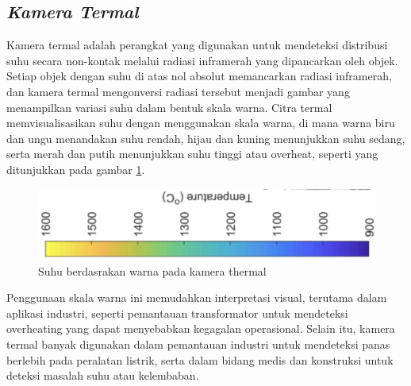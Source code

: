 \subsection{\emph{Kamera Termal}}
Kamera termal adalah perangkat yang digunakan untuk mendeteksi distribusi suhu secara non-kontak melalui radiasi inframerah yang dipancarkan oleh objek. Setiap objek dengan suhu di atas nol absolut memancarkan radiasi inframerah, dan kamera termal mengonversi radiasi tersebut menjadi gambar yang menampilkan variasi suhu dalam bentuk skala warna. Citra termal memvisualisasikan suhu dengan menggunakan skala warna, di mana warna biru dan ungu menandakan suhu rendah, hijau dan kuning menunjukkan suhu sedang, serta merah dan putih menunjukkan suhu tinggi atau overheat, seperti yang ditunjukkan pada gambar \ref{fig:thermal diagram}.


\begin{figure} [H] \centering
  \includegraphics[scale=0.45]{gambar/thermal_range.png}
  \caption{Suhu berdasrakan warna pada kamera thermal}
  \label{fig:thermal diagram}
\end{figure}


Penggunaan skala warna ini memudahkan interpretasi visual, terutama dalam aplikasi industri, seperti pemantauan transformator untuk mendeteksi overheating yang dapat menyebabkan kegagalan operasional. Selain itu, kamera termal banyak digunakan dalam pemantauan industri untuk mendeteksi panas berlebih pada peralatan listrik, serta dalam bidang medis dan konstruksi untuk deteksi masalah suhu atau kelembaban\cite{kartono2023pemanfaatan}.

